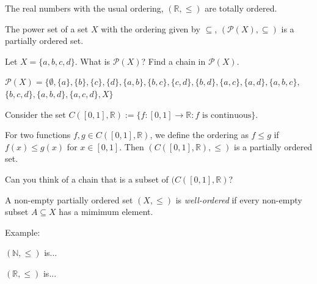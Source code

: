 \documentclass [aspectratio=169, handout]{beamer}
\newcommand{\R}{{\mathbb{R}}}
\newcommand{\N}{{\mathbb{N}}}
\newcommand{\cP}{\mathcal{P}}
\begin{document}
\begin{frame}
\begin{example}
The real numbers with the usual ordering, $(\R, \leq)$ are totally ordered. 
\end{example}

\begin{example}
The power set of a set $X$ with the ordering given by $\subseteq$, $(\cP(X), \subseteq)$ is a partially ordered set. 
\end{example}
\end{frame}

\begin{frame}
\begin{example}
Let $X = \{a,b,c,d\}$. What is $\cP(X)$? Find a chain in $\cP(X)$.

\vspace{1em}
\pause
$\cP(X) = \{\emptyset,\{a\},\{b\},\{c\},\{d\},\{a,b\},\{b,c\},\{c,d\},\{b,d\},\{a,c\},\{a,d\},\{a,b,c\}, $
 $ \{b,c,d\},\{a,b,d\},\{a,c,d\},X\}$


\vspace{3cm}
\end{example}
\end{frame}

\begin{frame}
\begin{example}
Consider the set $C([0,1],\R):= \{f:[0,1] \to \R : f \text{ is continuous}\}$.

\vspace{1em}

For two functions $f,g \in C([0,1],\R)$, we define the ordering as $f \leq g$ if $f(x) \leq g(x)$ for $x \in [0,1]$. Then $(C([0,1],\R),\leq)$ is a partially ordered set. 

\vspace{1em}

Can you think of a chain that is a subset of $(C([0,1],\R)$?
\end{example}

\end{frame}



\begin{frame}
\begin{definition}
A non-empty partially ordered set $(X,\leq)$ is \emph{well-ordered} if every non-empty subset $A \subseteq X$ has a mimimum element.
\end{definition}

\vspace{2em}

Example: 
\vspace{0.5em}

$(\N, \leq)$ is... 
\vspace{1em}

$(\R,\leq)$ is...
\end{frame}
\end{document}
